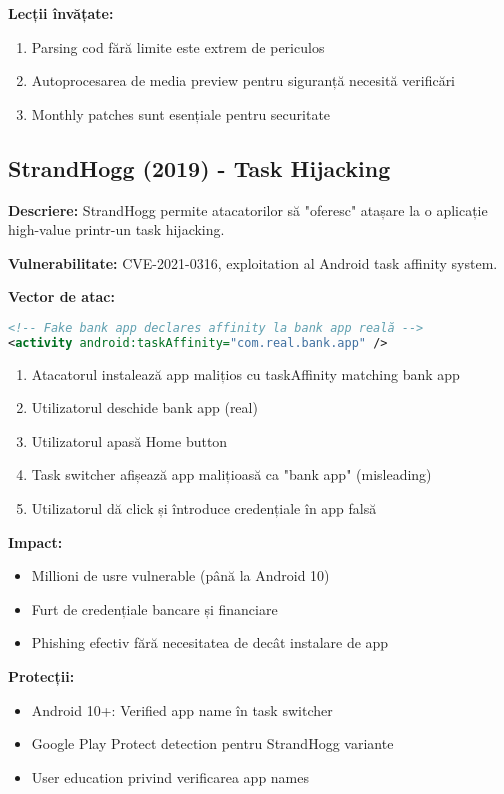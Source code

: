 \documentclass[11pt,a4paper,twocolumn]{article}
\theoremstyle{definition}
\theoremstyle{plain}
\theoremstyle{remark}
\begin{document}
\textbf{Lecții învățate:}
\begin{enumerate}
    \item Parsing cod fără limite este extrem de periculos
    \item Autoprocesarea de media preview pentru siguranță necesită verificări
    \item Monthly patches sunt esențiale pentru securitate
\end{enumerate}

\subsection{StrandHogg (2019) - Task Hijacking}

\textbf{Descriere:} StrandHogg permite atacatorilor să "oferesc" atașare la o aplicație high-value 
printr-un task hijacking.

\textbf{Vulnerabilitate:} CVE-2021-0316, exploitation al Android task affinity system.

\textbf{Vector de atac:}
\begin{lstlisting}[language=xml, basicstyle=\ttfamily\tiny]
<!-- Fake bank app declares affinity la bank app reală -->
<activity android:taskAffinity="com.real.bank.app" />
\end{lstlisting}

\begin{enumerate}
    \item Atacatorul instalează app malițios cu taskAffinity matching bank app
    \item Utilizatorul deschide bank app (real)
    \item Utilizatorul apasă Home button
    \item Task switcher afișează app malițioasă ca "bank app" (misleading)
    \item Utilizatorul dă click și întroduce credențiale în app falsă
\end{enumerate}

\textbf{Impact:}
\begin{itemize}
    \item Millioni de usre vulnerable (până la Android 10)
    \item Furt de credențiale bancare și financiare
    \item Phishing efectiv fără necesitatea de decât instalare de app
\end{itemize}

\textbf{Protecții:}
\begin{itemize}
    \item Android 10+: Verified app name în task switcher
    \item Google Play Protect detection pentru StrandHogg variante
    \item User education privind verificarea app names
\end{itemize}
\end{document}

